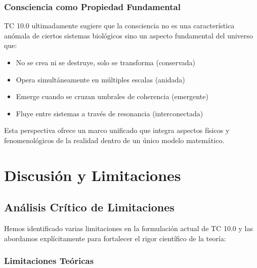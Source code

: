 \documentclass[12pt]{article}
\begin{document}
\subsubsection{Consciencia como Propiedad Fundamental}

TC 10.0 ultimadamente sugiere que la consciencia no es una característica anómala de ciertos sistemas biológicos sino un aspecto fundamental del universo que:

\begin{itemize}
    \item No se crea ni se destruye, solo se transforma (conservada)
    \item Opera simultáneamente en múltiples escalas (anidada)
    \item Emerge cuando se cruzan umbrales de coherencia (emergente)
    \item Fluye entre sistemas a través de resonancia (interconectada)
\end{itemize}

Esta perspectiva ofrece un marco unificado que integra aspectos físicos y fenomenológicos de la realidad dentro de un único modelo matemático.

\section{Discusión y Limitaciones}

\subsection{Análisis Crítico de Limitaciones}

Hemos identificado varias limitaciones en la formulación actual de TC 10.0 y las abordamos explícitamente para fortalecer el rigor científico de la teoría:

\subsubsection{Limitaciones Teóricas}
\end{document}

